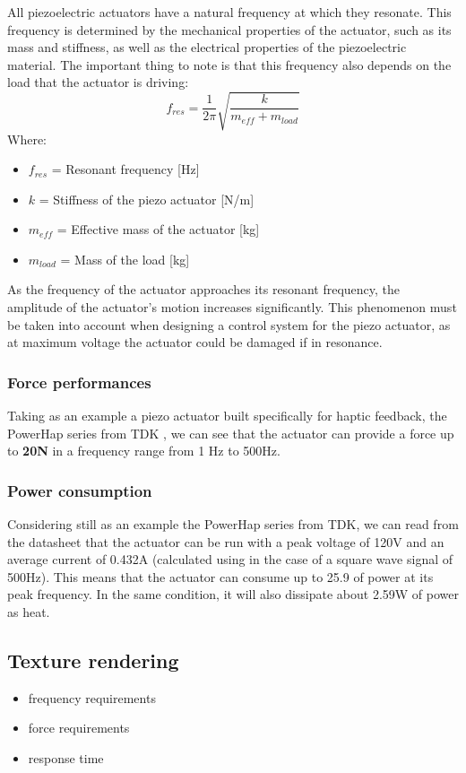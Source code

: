 All piezoelectric actuators have a natural frequency at which they resonate. This frequency is determined by the mechanical properties of the actuator, such as its mass and stiffness, as well as the electrical properties of the piezoelectric material.
The important thing to note is that this frequency also depends on the load that the actuator is driving:
\begin{equation}
    f_{res} = \frac{1}{2\pi} \sqrt{\frac{k}{m_{eff}+m_{load}}}
\end{equation}
Where:
\begin{itemize}
    \item \( f_{res} \) = Resonant frequency [Hz]
    \item \( k \) = Stiffness of the piezo actuator [N/m]
    \item \( m_{eff} \) = Effective mass of the actuator [kg]
    \item \( m_{load} \) = Mass of the load [kg]
\end{itemize}

As the frequency of the actuator approaches its resonant frequency, the amplitude of the actuator's motion increases significantly. This phenomenon must be taken into account when designing a control system for the piezo actuator, as at maximum voltage the actuator could be damaged if in resonance.

\subsubsection{Force performances}
Taking as an example a piezo actuator built specifically for haptic feedback, the PowerHap series from TDK \cite{Piezo_Haptic_Actuator}, we can see that the actuator can provide a force up to \textbf{20N} in a frequency range from 1 Hz to 500Hz.

\subsubsection{Power consumption}
Considering still as an example the PowerHap series from TDK, we can read from the datasheet that the actuator can be run with a peak voltage of 120V and an average current of 0.432A (calculated using \cite{Power_piezo_calculator} in the case of a square wave signal of 500Hz). This means that the actuator can consume up to 25.9 of power at its peak frequency.
In the same condition, it will also dissipate about 2.59W of power as heat.

\subsection{Texture rendering} %
\begin{itemize}
    \item frequency requirements
    \item force requirements
    \item response time
\end{itemize}

